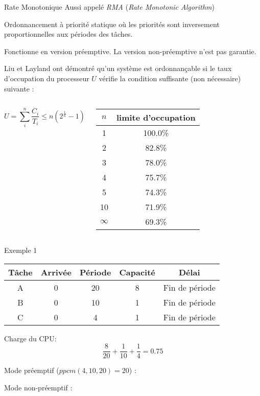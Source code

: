 \begin{frame}{Rate Monotonique}
  Aussi appelé \emph{RMA} (\emph{Rate Monotonic Algorithm})

  Ordonnancement à priorité statique où les priorités sont inversement
  proportionnelles aux périodes des tâches.

  Fonctionne  en version préemptive.  La version  non-préemptive n'est
  pas garantie.

  Liu et Layland ont démontré qu'un système est ordonnançable si le
  taux d'occupation du processeur $U$ vérifie la condition suffisante
  (non nécessaire) suivante :

  \begin{columns}
      $$U = \sum_i^n \frac{C_i}{T_i} ≤ n \left(2^{\frac{1}{n}}-1\right)$$

      \begin{center}
        \begin{tabular}{cc}
          \hline
          $n$ & limite d'occupation \\
          \hline
          1 & 100.0\% \\
          2 & 82.8\% \\
          3 & 78.0\% \\
          4 & 75.7\% \\
          5 & 74.3\% \\
          10 & 71.9\% \\
          $\infty$ & 69.3\%\\
          \hline
        \end{tabular}
      \end{center}
  \end{columns}
\end{frame}

\begin{frame}{Exemple 1}
  \begin{center}
    \begin{tabular}{ccccc}
      \hline
      Tâche & Arrivée & Période & Capacité & Délai \\
      \hline
      A & 0 & 20 & 8 & Fin de période\\
      B & 0 & 10 & 1 & Fin de période\\
      C & 0 &  4 & 1 & Fin de période\\
      \hline
    \end{tabular}
  \end{center}
  \begin{overprint}
    Charge du CPU:
    $$\frac{8}{20} + \frac{1}{10} + \frac{1}{4} = 0.75$$

    Mode préemptif ($ppcm(4, 10, 20) = 20$) :
    \begin{center}
      
    \end{center}

    Mode non-préemptif :
    \begin{center}
      
    \end{center}
  \end{overprint}
\end{frame}

